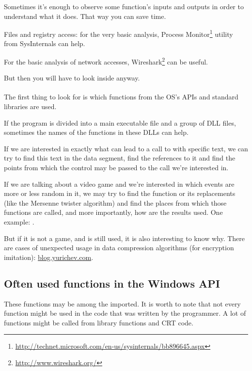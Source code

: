 
Sometimes it's enough to observe some function's inputs and outputs in order to understand what it does.
That way you can save time.

Files and registry access: 
for the very basic analysis, Process Monitor\footnote{\url{http://technet.microsoft.com/en-us/sysinternals/bb896645.aspx}}
utility from SysInternals can help.

For the basic analysis of network accesses, Wireshark\footnote{\url{http://www.wireshark.org/}} can be useful.

But then you will have to look inside anyway. \\
\\
The first thing to look for is which functions from the \ac{OS}'s \ac{API}s and standard libraries are used.

If the program is divided into a main executable file and a group of DLL files, sometimes the names of the functions in these DLLs can help.

If we are interested in exactly what can lead to a call to  with specific text, 
we can try to find this text in the data segment, find the references to it and find the points
from which the control may be passed to the  call we're interested in.

If we are talking about a video game and we're interested in which events are more or less random in it,
we may try to find the \rand function or its replacements (like the Mersenne twister algorithm) and find the places
from which those functions are called, and more importantly, how are the results used.
One example: . 

But if it is not a game, and \rand is still used, it is also interesting to know why.
There are cases of unexpected \rand usage in data compression algorithms (for encryption imitation):
\href{http://blog.yurichev.com/node/44}{blog.yurichev.com}.

\subsection{Often used functions in the Windows API}

These functions may be among the imported.
It is worth to note that not every function might be used in the code that was written by the programmer.
A lot of functions might be called from library functions and \ac{CRT} code.

